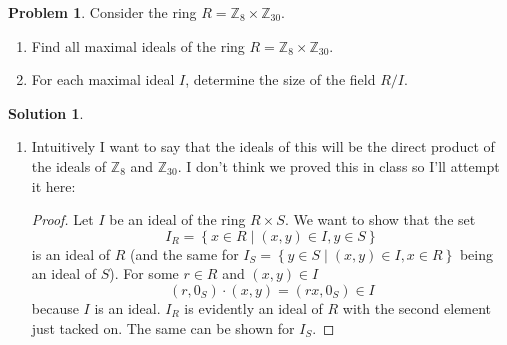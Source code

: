 \documentclass[10pt]{article}
\theoremstyle{definition}
\newtheorem{problem}{Problem}
\newtheorem{soln}{Solution}
\begin{document}
\begin{problem}
Consider the ring $R = \mathbb{Z}_8\times \mathbb{Z}_{30}$.
\begin{enumerate}[label=(\alph*)]
  \item Find all maximal ideals of the ring $R = \mathbb{Z}_8\times \mathbb{Z}_{30}$.
  \item For each maximal ideal $I$, determine the size of the field $R/I$.
\end{enumerate}
\end{problem}
\begin{soln}~
  \begin{enumerate}[label=(\alph*)]
    \item Intuitively I want to say that the ideals of this will be the direct product of the ideals
          of $\mathbb{Z}_8$ and $\mathbb{Z}_{30}$. I don't think we proved this in class so I'll attempt it here:
          \begin{proof}
            Let $I$ be an ideal of the ring $R\times S$.
            We want to show that the set
            $$I_{R}=\left\{x\in R\mid (x,y)\in I,y\in S\right\}$$
            is an ideal of $R$ (and the same for $I_{S}=\left\{y\in S\mid (x,y)\in I,x\in R\right\}$ being an ideal of $S$). For some $r\in R$ and $(x,y)\in I$
            $$(r,0_S)\cdot(x,y)=(rx,0_S)\in I$$
            because $I$ is an ideal. $I_R$ is evidently an ideal of $R$ with the second element just tacked on.
            The same can be shown for $I_S$.


\end{proof}
\end{enumerate}
\end{soln}
\end{document}
